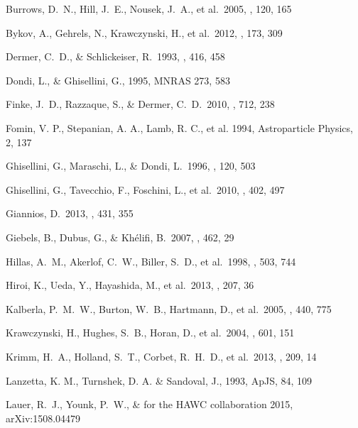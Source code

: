 \documentclass[twocolumn]{aastex6}
\begin{document}
\begin{thebibliography}{99}
 Burrows, D.~N., Hill, J.~E., Nousek, J.~A., et al.\ 2005, \ssr, 120, 165 

 Bykov, A., Gehrels, N., Krawczynski, H., et al.\ 2012, \ssr, 173, 309 

 Dermer, C.~D., \& Schlickeiser, R.\ 1993, \apj, 416, 458 

 Dondi, L., \& Ghisellini, G., 1995, MNRAS 273, 583

 Finke, J.~D., Razzaque, S., \& Dermer, C.~D.\ 2010, \apj, 712, 238 

 Fomin, V. P., Stepanian, A. A., Lamb, R. C., et al. 1994, Astroparticle Physics, 2, 137

 Ghisellini, G., Maraschi, L., \& Dondi, L.\ 1996, \aaps, 120, 503 

 Ghisellini, G., 
Tavecchio, F., Foschini, L., et al.\ 2010, \mnras, 402, 497 

 Giannios, D.\ 2013, \mnras, 
431, 355 

 Giebels, B., Dubus, G., \& Kh{\'e}lifi, B.\ 2007, \aap, 462, 29 

 Hillas, A.~M., Akerlof, 
C.~W., Biller, S.~D., et al.\ 1998, \apj, 503, 744 

 Hiroi, K., Ueda, Y., 
Hayashida, M., et al.\ 2013, \apjs, 207, 36 

 Kalberla, P.~M.~W., Burton, W.~B., Hartmann, D., et al.\ 2005, \aap, 440, 775 

 Krawczynski, H., 
Hughes, S.~B., Horan, D., et al.\ 2004, \apj, 601, 151 

 Krimm, H.~A., Holland, 
S.~T., Corbet, R.~H.~D., et al.\ 2013, \apjs, 209, 14 

 Lanzetta, K. M., Turnshek, D. A. \& Sandoval, J., 1993, ApJS, 84, 109

 Lauer, R.~J., Younk, 
P.~W., \& for the HAWC collaboration 2015, arXiv:1508.04479 


\end{thebibliography}
\end{document}

